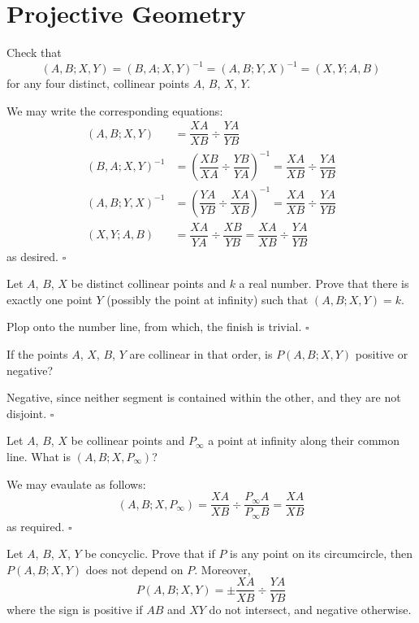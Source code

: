 \documentclass{article}
\begin{document}
\section{Projective Geometry}

\begin{problem}[9.3]{}
Check that \[(A,B;X,Y) = (B,A;X,Y)^{-1}=(A,B;Y,X)^{-1} = (X,Y;A,B)\] for any four distinct, collinear points $A$, $B$, $X$, $Y$.
\end{problem}

We may write the corresponding equations:
\begin{align*}
(A,B;X,Y) &= \dfrac{XA}{XB}\div \dfrac{YA}{YB} \\
(B,A;X,Y)^{-1} &= \left(\dfrac{XB}{XA}\div \dfrac{YB}{YA}\right)^{-1} = \dfrac{XA}{XB}\div \dfrac{YA}{YB} \\
(A,B;Y,X)^{-1} &= \left(\dfrac{YA}{YB}\div \dfrac{XA}{XB}\right)^{-1} = \dfrac{XA}{XB}\div \dfrac{YA}{YB} \\
(X,Y;A,B) &= \dfrac{XA}{YA}\div \dfrac{XB}{YB} = \dfrac{XA}{XB}\div \dfrac{YA}{YB}
\end{align*}
as desired. $\square$

\begin{problem}[9.4]{}
Let $A$, $B$, $X$ be distinct collinear points and $k$ a real number. Prove that there is exactly one point $Y$ (possibly the point at infinity) such that $(A, B; X, Y ) = k$.
\end{problem}

Plop onto the number line, from which, the finish is trivial. $\square$

\begin{problem}[9.5]{}
If the points $A$, $X$, $B$, $Y$ are collinear in that order, is $P(A, B; X, Y)$ positive or negative?
\end{problem}

Negative, since neither segment is contained within the other, and they are not disjoint. $\square$

\begin{problem}[9.6]{}
Let $A$, $B$, $X$ be collinear points and $P_{\infty}$ a point at infinity along their common line. What is $(A, B; X, P_{\infty})$?
\end{problem}

We may evaulate as follows: \[(A, B; X, P_{\infty}) = \dfrac{XA}{XB} \div \dfrac{P_{\infty}A}{P_{\infty}B} = \dfrac{XA}{XB}\] as required. $\square$

\newpage

\begin{problem}[9.7]{}
Let $A$, $B$, $X$, $Y$ be concyclic. Prove that if $P$ is any point on its circumcircle, then $P(A, B; X, Y)$ does not depend on $P$. Moreover, \[P(A, B; X, Y ) = \pm\dfrac{XA}{XB} \div \dfrac{YA}{YB}\] where the sign is positive if $AB$ and $XY$ do not intersect, and negative otherwise.
\end{problem}
\end{document}
